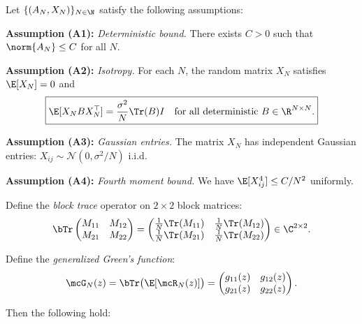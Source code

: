 \begin{theorem}\label{thm:main}
Let $\{(A_N, X_N)\}_{N \in \N}$ satisfy the following assumptions:

\medskip
\noindent\textbf{Assumption (A1):} \emph{Deterministic bound.} There exists $C > 0$ such that $\norm{A_N} \leq C$ for all $N$.

\medskip
\noindent\textbf{Assumption (A2):} \emph{Isotropy.} For each $N$, the random matrix $X_N$ satisfies $\E[X_N] = 0$ and
\begin{equation}\label{eq:isotropy}
\boxed{\E[X_N B X_N^\top] = \frac{\sigma^2}{N}\Tr(B) I \quad \text{for all deterministic } B \in \R^{N \times N}.}
\end{equation}

\medskip
\noindent\textbf{Assumption (A3):} \emph{Gaussian entries.} The matrix $X_N$ has independent Gaussian entries: $X_{ij} \sim \mathcal{N}(0, \sigma^2/N)$ i.i.d.

\medskip
\noindent\textbf{Assumption (A4):} \emph{Fourth moment bound.} We have $\E[X_{ij}^4] \leq C/N^2$ uniformly.

\medskip
\noindent Define the \emph{block trace} operator on $2 \times 2$ block matrices:
\begin{equation}
\bTr\begin{pmatrix} M_{11} & M_{12} \\ M_{21} & M_{22} \end{pmatrix}
= \begin{pmatrix} \frac{1}{N}\Tr(M_{11}) & \frac{1}{N}\Tr(M_{12}) \\ \frac{1}{N}\Tr(M_{21}) & \frac{1}{N}\Tr(M_{22}) \end{pmatrix} \in \C^{2 \times 2}.
\end{equation}

\noindent Define the \emph{generalized Green's function}:
\begin{equation}
\mcG_N(z) = \bTr\bigl(\E[\mcR_N(z)]\bigr) = \begin{pmatrix} g_{11}(z) & g_{12}(z) \\ g_{21}(z) & g_{22}(z) \end{pmatrix}.
\end{equation}

Then the following hold:


\end{theorem}
